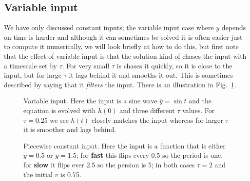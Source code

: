 \documentclass{article}
\begin{document}
\subsection*{Variable input}

We have only discussed constant inputs; the variable input case where
$y$ depends on time is harder and although it can sometimes be solved
it is often easier just to compute it numerically, we will look
briefly at how to do this, but first note that the effect of variable
input is that the solution kind of chases the input with a timescale
set by $\tau$. For very small $\tau$ is chases it quickly, so it is
close to the input, but for large $\tau$ it lags behind it and smooths
it out. This is sometimes described by saying that it \textsl{filters}
the input. There is an illustration in Fig.~\ref{chasing}.

\begin{figure}
\begin{center}

\end{center}
\caption{Variable input. Here the input is a sine wave
  $\bar{y}=\sin{t}$ and the equation is evolved with $h(0)$ and three
  different $\tau$ values. For $\tau=0.25$ we see $h(t)$ closely
  matches the input whereas for larger $\tau$ it is smoother and lags
  behind.\label{chasing}}
\end{figure}


\begin{figure}
\begin{center}

\end{center}
\caption{Piecewise constant input. Here the input is a function that
  is either $y=0.5$ or $y=1.5$; for \textbf{fast} this flips every 0.5
  so the period is one, for \textbf{slow} it flips ever 2.5 so the
  persion is 5; in both cases $\tau=2$ and the initial $v$ is 0.75.\label{pw}}
\end{figure}
\end{document}
